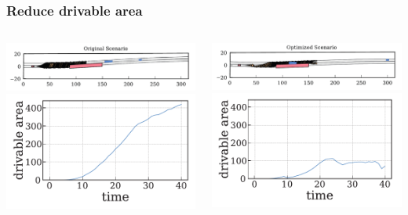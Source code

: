\documentclass{beamer}
\begin{document}
\begin{frame}
    \frametitle{Reduce drivable area}
    \begin{columns}
        \begin{column}{0.5\textwidth}
            \includegraphics[width=\textwidth]{sc_original.png}
            \includegraphics[width=\textwidth]{sc_original_drivableArea.png}
            \pause{}
        \end{column}
        \begin{column}{0.5\textwidth}
            \includegraphics[width=\textwidth]{sc_optimized.png}
            \includegraphics[width=\textwidth]{sc_optimized_drivableArea.png}
        \end{column}
    \end{columns}
\end{frame}
\end{document}
